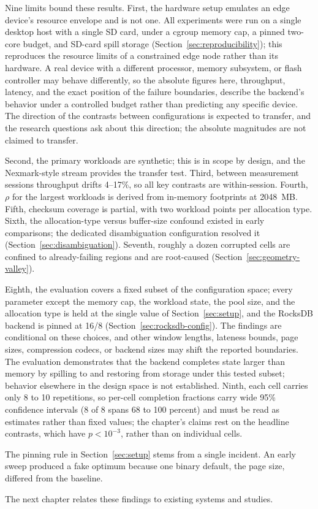 Nine limits bound these results.
First, the hardware setup emulates an edge device's resource envelope and is not one.
All experiments were run on a single desktop host with a single SD card, under a cgroup memory cap, a pinned two-core budget, and SD-card spill storage (Section~\ref{sec:reproducibility}); this reproduces the resource limits of a constrained edge node rather than its hardware.
A real device with a different processor, memory subsystem, or flash controller may behave differently, so the absolute figures here, throughput, latency, and the exact position of the failure boundaries, describe the backend's behavior under a controlled budget rather than predicting any specific device.
The direction of the contrasts between configurations is expected to transfer, and the research questions ask about this direction; the absolute magnitudes are not claimed to transfer.

Second, the primary workloads are synthetic; this is in scope by design, and the Nexmark-style stream provides the transfer test.
Third, between measurement sessions throughput drifts 4--17\%, so all key contrasts are within-session.
Fourth, $\rho$ for the largest workloads is derived from in-memory footprints at 2048\, MB.
Fifth, checksum coverage is partial, with two workload points per allocation type.
Sixth, the allocation-type versus buffer-size confound existed in early comparisons; the dedicated disambiguation configuration resolved it (Section~\ref{sec:disambiguation}).
Seventh, roughly a dozen corrupted cells are confined to already-failing regions and are root-caused (Section~\ref{sec:geometry-valley}).

Eighth, the evaluation covers a fixed subset of the configuration space; every parameter except the memory cap, the workload state, the pool size, and the allocation type is held at the single value of Section~\ref{sec:setup}, and the RocksDB backend is pinned at 16/8 (Section~\ref{sec:rocksdb-config}).
The findings are conditional on these choices, and other window lengths, lateness bounds, page sizes, compression codecs, or backend sizes may shift the reported boundaries.
The evaluation demonstrates that the backend completes state larger than memory by spilling to and restoring from storage under this tested subset; behavior elsewhere in the design space is not established.
Ninth, each cell carries only 8 to 10 repetitions, so per-cell completion fractions carry wide 95\% confidence intervals (8 of 8 spans 68 to 100 percent) and must be read as estimates rather than fixed values; the chapter's claims rest on the headline contrasts, which have $p < 10^{-3}$, rather than on individual cells.

The pinning rule in Section~\ref{sec:setup} stems from a single incident.
An early sweep produced a fake optimum because one binary default, the page size, differed from the baseline.

The next chapter relates these findings to existing systems and studies.
